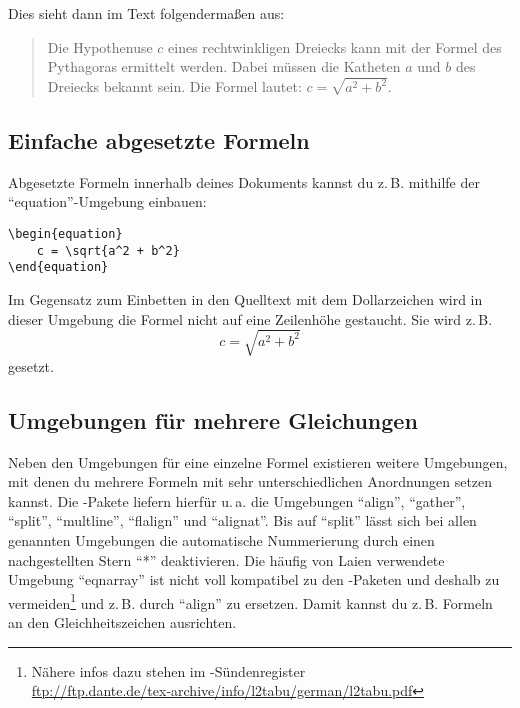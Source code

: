 Dies sieht dann im Text folgendermaßen aus:

\begin{quote}
	Die Hypothenuse $c$ eines rechtwinkligen Dreiecks kann mit der Formel 
	des Pythagoras ermittelt werden. Dabei müssen die Katheten $a$ und $b$
	des Dreiecks bekannt sein.
	Die Formel lautet: $c = \sqrt{a^2 + b^2}$. 
\end{quote}

\subsection{Einfache abgesetzte Formeln}

Abgesetzte Formeln innerhalb deines Dokuments kannst du z.\,B. mithilfe der \enquote{equation}-Umgebung einbauen:

\begin{lstlisting}
\begin{equation}
	c = \sqrt{a^2 + b^2}
\end{equation}
\end{lstlisting}

Im Gegensatz zum Einbetten in den Quelltext mit dem Dollarzeichen wird in dieser Umgebung die Formel nicht auf eine Zeilenhöhe gestaucht. Sie wird z.\,B.
\begin{equation}
	c = \sqrt{a^2 + b^2}
\end{equation}
gesetzt.

\subsection{Umgebungen für mehrere Gleichungen}

Neben den Umgebungen für eine einzelne Formel existieren weitere Umgebungen, mit denen du mehrere Formeln mit sehr unterschiedlichen Anordnungen setzen kannst. Die \AmSmath-Pakete liefern hierfür u.\,a. die Umgebungen \enquote{align}, \enquote{gather}, \enquote{split}, \enquote{multline}, \enquote{flalign} und \enquote{alignat}. Bis auf \enquote{split} lässt sich bei allen genannten Umgebungen die automatische Nummerierung durch einen nachgestellten Stern \enquote{*} deaktivieren. Die häufig von Laien verwendete Umgebung \enquote{eqnarray} ist nicht voll kompatibel zu den \AmSmath-Paketen und deshalb zu vermeiden\footnote{Nähere infos dazu stehen im \DMLLaTeX-Sündenregister\\\href{ftp://ftp.dante.de/tex-archive/info/l2tabu/german/l2tabu.pdf}{ftp://ftp.dante.de/tex-archive/info/l2tabu/german/l2tabu.pdf}} und z.\,B. durch \enquote{align} zu ersetzen. Damit kannst du z.\,B. Formeln an den Gleichheitszeichen ausrichten.

